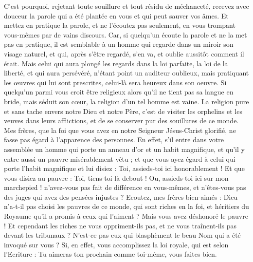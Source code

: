 \begin{multicols}{2}
C'est pourquoi, rejetant toute souillure et tout résidu de méchanceté, recevez avec douceur la parole qui a été plantée en vous et qui peut sauver vos âmes.
Et mettez en pratique la parole, et ne l'écoutez pas seulement, en vous trompant vous-mêmes par de vains discours.
Car, si quelqu'un écoute la parole et ne la met pas en pratique, il est semblable à un homme qui regarde dans un miroir son visage naturel,
et qui, après s'être regardé, s'en va, et oublie aussitôt comment il était.
Mais celui qui aura plongé les regards dans la loi parfaite, la loi de la liberté, et qui aura persévéré, n'étant point un auditeur oublieux, mais pratiquant les œuvres qui lui sont prescrites, celui-là sera heureux dans son oeuvre.
Si quelqu'un parmi vous croit être religieux alors qu'il ne tient pas sa langue en bride, mais séduit son cœur, la religion d'un tel homme est vaine.
La religion pure et sans tache envers notre Dieu et notre Père, c'est de visiter les orphelins et les veuves dans leurs afflictions, et de se conserver pur des souillures de ce monde.
\VerseOne{}Mes frères, que la foi que vous avez en notre Seigneur Jésus-Christ glorifié, ne fasse pas égard à l'apparence des personnes.
En effet, s'il entre dans votre assemblée un homme qui porte un anneau d'or et un habit magnifique, et qu'il y entre aussi un pauvre misérablement vêtu ;
et que vous ayez égard à celui qui porte l'habit magnifique et lui disiez : Toi, assieds-toi ici honorablement ! Et que vous disiez au pauvre : Toi, tiens-toi là debout ! Ou, assieds-toi ici sur mon marchepied !
n'avez-vous pas fait de différence en vous-mêmes, et n'êtes-vous pas des juges qui avez des pensées injustes ?
Ecoutez, mes frères bien-aimés : Dieu n'a-t-il pas choisi les pauvres de ce monde, qui sont riches en la foi, et héritiers du Royaume qu'il a promis à ceux qui l'aiment ?
Mais vous avez déshonoré le pauvre ! Et cependant les riches ne vous oppriment-ils pas, et ne vous traînent-ils pas devant les tribunaux ?
N'est-ce pas eux qui blasphèment le beau Nom qui a été invoqué sur vous ?
Si, en effet, vous accomplissez la loi royale, qui est selon l'Ecriture : Tu aimeras ton prochain comme toi-même, vous faites bien.

\end{multicols}
